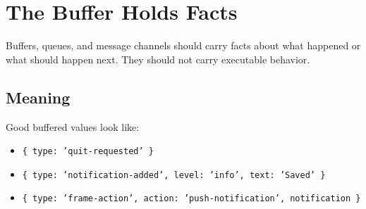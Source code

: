 \chapter{The Buffer Holds Facts}\label{record-036}

\smallskip

Buffers, queues, and message channels should carry facts about what happened or what should happen next. They should not carry executable behavior.

\section{Meaning}\label{record-036-meaning}

Good buffered values look like:

\begin{itemize}
\tightlist
\item
  \texttt{\{\allowbreak{} \allowbreak{}t\allowbreak{}y\allowbreak{}p\allowbreak{}e\allowbreak{}:\allowbreak{} \allowbreak{}'\allowbreak{}q\allowbreak{}u\allowbreak{}i\allowbreak{}t\allowbreak{}-\allowbreak{}r\allowbreak{}e\allowbreak{}q\allowbreak{}u\allowbreak{}e\allowbreak{}s\allowbreak{}t\allowbreak{}e\allowbreak{}d\allowbreak{}'\allowbreak{} \allowbreak{}\}}
\item
  \texttt{\{\allowbreak{} \allowbreak{}t\allowbreak{}y\allowbreak{}p\allowbreak{}e\allowbreak{}:\allowbreak{} \allowbreak{}'\allowbreak{}n\allowbreak{}o\allowbreak{}t\allowbreak{}i\allowbreak{}f\allowbreak{}i\allowbreak{}c\allowbreak{}a\allowbreak{}t\allowbreak{}i\allowbreak{}o\allowbreak{}n\allowbreak{}-\allowbreak{}a\allowbreak{}d\allowbreak{}d\allowbreak{}e\allowbreak{}d\allowbreak{}'\allowbreak{},\allowbreak{} \allowbreak{}l\allowbreak{}e\allowbreak{}v\allowbreak{}e\allowbreak{}l\allowbreak{}:\allowbreak{} \allowbreak{}'\allowbreak{}i\allowbreak{}n\allowbreak{}f\allowbreak{}o\allowbreak{}'\allowbreak{},\allowbreak{} \allowbreak{}t\allowbreak{}e\allowbreak{}x\allowbreak{}t\allowbreak{}:\allowbreak{} \allowbreak{}'\allowbreak{}S\allowbreak{}a\allowbreak{}v\allowbreak{}e\allowbreak{}d\allowbreak{}'\allowbreak{} \allowbreak{}\}}
\item
  \texttt{\{\allowbreak{} \allowbreak{}t\allowbreak{}y\allowbreak{}p\allowbreak{}e\allowbreak{}:\allowbreak{} \allowbreak{}'\allowbreak{}f\allowbreak{}r\allowbreak{}a\allowbreak{}m\allowbreak{}e\allowbreak{}-\allowbreak{}a\allowbreak{}c\allowbreak{}t\allowbreak{}i\allowbreak{}o\allowbreak{}n\allowbreak{}'\allowbreak{},\allowbreak{} \allowbreak{}a\allowbreak{}c\allowbreak{}t\allowbreak{}i\allowbreak{}o\allowbreak{}n\allowbreak{}:\allowbreak{} \allowbreak{}'\allowbreak{}p\allowbreak{}u\allowbreak{}s\allowbreak{}h\allowbreak{}-\allowbreak{}n\allowbreak{}o\allowbreak{}t\allowbreak{}i\allowbreak{}f\allowbreak{}i\allowbreak{}c\allowbreak{}a\allowbreak{}t\allowbreak{}i\allowbreak{}o\allowbreak{}n\allowbreak{}'\allowbreak{},\allowbreak{} \allowbreak{}n\allowbreak{}o\allowbreak{}t\allowbreak{}i\allowbreak{}f\allowbreak{}i\allowbreak{}c\allowbreak{}a\allowbreak{}t\allowbreak{}i\allowbreak{}o\allowbreak{}n\allowbreak{} \allowbreak{}\}}
\end{itemize}

